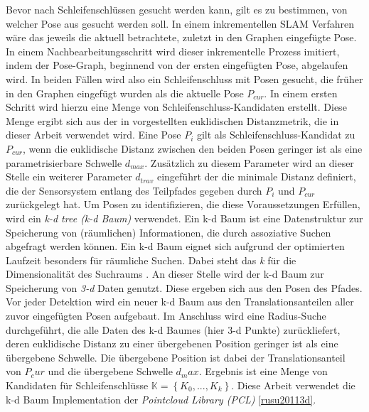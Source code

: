 Bevor nach Schleifenschlüssen gesucht werden kann, gilt es zu bestimmen, von welcher Pose aus gesucht werden soll. In einem inkrementellen SLAM Verfahren wäre das jeweils die aktuell betrachtete, zuletzt in den Graphen eingefügte Pose. In einem Nachbearbeitungsschritt wird dieser inkrementelle Prozess imitiert, indem der Pose-Graph, beginnend von der ersten eingefügten Pose, abgelaufen wird. In beiden Fällen wird also ein Schleifenschluss mit Posen gesucht, die früher in den Graphen eingefügt wurden als die aktuelle Pose $P_{cur}$. In einem ersten Schritt wird hierzu eine Menge von Schleifenschluss-Kandidaten erstellt. Diese Menge ergibt sich aus der in \cite{borrmann2008globally, shan2020lio} vorgestellten euklidischen Distanzmetrik, die in dieser Arbeit verwendet wird. Eine Pose $P_i$ gilt als Schleifenschluss-Kandidat zu $P_{cur}$, wenn die euklidische Distanz zwischen den beiden Posen geringer ist als eine parametrisierbare Schwelle $d_{max}$. Zusätzlich zu diesem Parameter wird an dieser Stelle ein weiterer Parameter $d_{trav}$ eingeführt der die minimale Distanz definiert, die der Sensorsystem entlang des Teilpfades gegeben durch $P_i$ und $P_{cur}$ zurückgelegt hat. Um Posen zu identifizieren, die diese Voraussetzungen Erfüllen, wird ein \emph{k-d tree (k-d Baum)} \cite{bentley1975multidimensional} verwendet. Ein k-d Baum ist eine Datenstruktur zur Speicherung von (räumlichen) Informationen, die durch assoziative Suchen abgefragt werden können. Ein k-d Baum eignet sich aufgrund der optimierten Laufzeit besonders für räumliche Suchen. Dabei steht das \emph{k} für die Dimensionalität des Suchraums \cite{bentley1975multidimensional}. An dieser Stelle wird der k-d Baum zur Speicherung von \emph{3-d} Daten genutzt. Diese ergeben sich aus den Posen des Pfades. Vor jeder Detektion wird ein neuer k-d Baum aus den Translationsanteilen aller zuvor eingefügten Posen aufgebaut. Im Anschluss wird eine Radius-Suche durchgeführt, die alle Daten des k-d Baumes (hier 3-d Punkte) zurückliefert, deren euklidische Distanz zu einer übergebenen Position geringer ist als eine übergebene Schwelle. Die übergebene Position ist dabei der Translationsanteil von $P_cur$ und die übergebene Schwelle $d_max$. Ergebnis ist eine Menge von Kandidaten für Schleifenschlüsse $\mathbb{K} = \left\lbrace K_0, ..., K_k \right\rbrace$. Diese Arbeit verwendet die k-d Baum Implementation der \emph{Pointcloud Library (PCL)} \ref{rusu20113d}.

